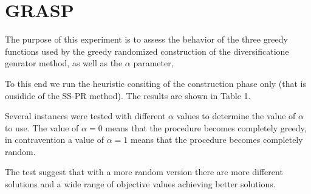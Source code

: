 \section{GRASP}
The purpose of this experiment
is to assess the behavior of the three greedy functions
used by the greedy randomized construction
of the diversificatione genrator method,
as well as the $\alpha$ parameter,

To this end
we run the heuristic consiting of
the construction phase only
(that is ousidide of the SS-PR method).
The results are shown in Table 1.

Several instances were tested
with different $\alpha$ values
to determine the value of $\alpha$ to use.
The value of $\alpha = 0$ means that
the procedure becomes completely greedy,
in contravention
a value of $\alpha = 1$ means that
the procedure becomes completely random.

The test suggest
that
with a more random version
there are more different solutions
and a wide range of objective values
achieving better solutions.
